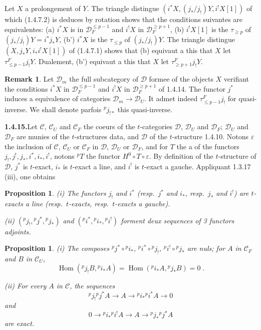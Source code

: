 \documentclass[12pt,a4paper]{article}
\theoremstyle{plain}
\newtheorem{proposition}[theorem]{Proposition}
\theoremstyle{definition}
\newtheorem{remark}[theorem]{Remark}
\DeclareMathOperator{\Hom}{Hom}
\begin{document}
Let $X$ a prolongement of $Y$. The triangle distingue $(i^*X, (j_*/j_!)Y, i^!X[1])$ of which (1.4.7.2) is deduces by rotation shows that the conditions suivantes are equivalentes: (a) $i^*X$ is in $\mathcal{D}_F^{\leqslant p-1}$ and $i^!X$ in $\mathcal{D}_F^{\geqslant p+1}$, (b) $i^!X[1]$ is the $\tau_{\geqslant p}$ of $(j_*/j_!)Y = i^*j_*Y$, (b') $i^*X$ is the $\tau_{\leqslant p}$ of $(j_*/j_!)Y$. The triangle distingue $(X, j_*Y, i_*i^!X[1])$ of (1.4.7.1) shows that (b) equivaut a this that $X$ let $\tau_{\leqslant p-1}^F j_!Y$. Dualement, (b') equivaut a this that $X$ let $\tau_{\geqslant p+1}^F j_!Y$.

\begin{remark}\label{rem:1.4.14.1}
Let $\mathcal{D}_m$ the full subcategory of $\mathcal{D}$ formee of the objects $X$ verifiant the conditions $i^*X$ in $\mathcal{D}_F^{\leqslant p-1}$ and $i^!X$ in $\mathcal{D}_F^{\geqslant p+1}$ of 1.4.14. The functor $j^*$ induces a equivalence of categories $\mathcal{D}_m \to \mathcal{D}_U$. It admet indeed $\tau_{\leqslant p-1}^F j_!$ for quasi-inverse. We shall denote parfois ${}^p j_{!*}$ this quasi-inverse.
\end{remark}

\smallskip
\noindent\textbf{1.4.15.}\quad Let $\mathcal{C}$, $\mathcal{C}_U$ and $\mathcal{C}_F$ the coeurs of the $t$-categories $\mathcal{D}$, $\mathcal{D}_U$ and $\mathcal{D}_F$; $\mathcal{D}_U$ and $\mathcal{D}_F$ are munies of the $t$-structures data, and $\mathcal{D}$ of the $t$-structure 1.4.10. Notons $\varepsilon$ the inclusion of $\mathcal{C}$, $\mathcal{C}_U$ or $\mathcal{C}_F$ in $\mathcal{D}$, $\mathcal{D}_U$ or $\mathcal{D}_F$, and for $T$ the a of the functors $j_!, j^!, j_*, i^*, i_*, i^!$, notons ${}^p T$ the functor $H^0 \circ T \circ \varepsilon$. By definition of the $t$-structure of $\mathcal{D}$, $j^*$ is $t$-exact, $i_*$ is $t$-exact a line, and $i^!$ is $t$-exact a gauche. Appliquant 1.3.17 (iii), one obtains

\begin{proposition}\label{prop:1.4.16}
\emph{(i)} The functors $j_!$ and $i^*$ (resp.\ $j^*$ and $i_*$, resp.\ $j_*$ and $i^!$) are $t$-exacts a line (resp.\ $t$-exacts, resp.\ $t$-exacts a gauche).

\emph{(ii)} $({}^p j_!, {}^p j^*, {}^p j_*)$ and $({}^p i^*, {}^p i_*, {}^p i^!)$ forment deux sequences of 3 functors adjoints.
\end{proposition}

\begin{proposition}\label{prop:1.4.17}
\emph{(i)} The composes ${}^p j^* \circ {}^p i_*$, ${}^p i^* \circ {}^p j_!$, ${}^p i^! \circ {}^p j_*$ are nuls; for $A$ in $\mathcal{C}_F$ and $B$ in $\mathcal{C}_U$,
\[
\Hom({}^p j_! B, {}^p i_* A) = \Hom({}^p i_* A, {}^p j_* B) = 0\;.
\]

\emph{(ii)} For every $A$ in $\mathcal{C}$, the sequences
\[
{}^p j_! {}^p j^* A \to A \to {}^p i_* {}^p i^* A \to 0
\]
and
\[
0 \to {}^p i_* {}^p i^! A \to A \to {}^p j_* {}^p j^* A
\]
are exact.
\end{proposition}
\end{document}
